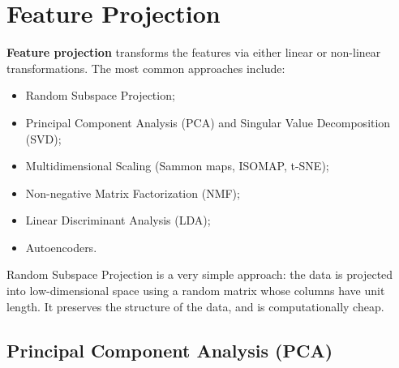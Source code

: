 \section{Feature Projection}

\textbf{Feature projection} transforms the features via either linear or non-linear transformations. The most common approaches include:
\begin{itemize}
    \item Random Subspace Projection;

    \item Principal Component Analysis (PCA) and Singular Value Decomposition (SVD);
    
    \item Multidimensional Scaling (Sammon maps, ISOMAP, t-SNE);

    \item Non-negative Matrix Factorization (NMF);

    \item Linear Discriminant Analysis (LDA);

    \item Autoencoders.
\end{itemize}
Random Subspace Projection is a very simple approach: the data is projected into low-dimensional space using a random matrix whose columns have unit length. It preserves the structure of the data, and is computationally cheap.

\subsection{Principal Component Analysis (PCA)}

